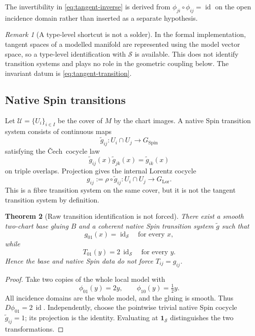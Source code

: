 \documentclass[11pt,a4paper]{article}
\newtheorem{theorem}{Theorem}[section]
\theoremstyle{definition}
\theoremstyle{remark}
\newtheorem{remark}[theorem]{Remark}
\newcommand{\Smodel}{\mathcal{S}}
\newcommand{\SpinG}{G_{\mathrm{Spin}}}
\newcommand{\LorG}{G_{\mathrm{Lor}}}
\newcommand{\id}{\operatorname{id}}
\newcommand{\Cech}{\ifmmode\text{\v{C}ech}\else\v{C}ech\fi}
\newcommand{\cU}{\mathcal{U}}
\begin{document}
The invertibility in \eqref{eq:tangent-inverse} is derived from
\(\phi_{ji}\circ\phi_{ij}=\id\) on the open incidence domain rather than
inserted as a separate hypothesis.

\begin{remark}[A type-level shortcut is not a solder]
In the formal implementation, tangent spaces of a modelled manifold are
represented using the model vector space, so a type-level identification
with \(\Smodel\) is available.  This does not identify transition systems
and plays no role in the geometric coupling below.  The invariant datum is
\eqref{eq:tangent-transition}.
\end{remark}

\subsection{Native Spin transitions}

Let \(\cU=\{U_i\}_{i\in I}\) be the cover of \(M\) by the chart images.
A native Spin transition system consists of continuous maps
\[
   \widetilde g_{ij}:U_i\cap U_j\longrightarrow\SpinG
\tag{6.3}
\]
satisfying the \Cech\ cocycle law
\[
   \widetilde g_{ij}(x)\widetilde g_{jk}(x)
   =
   \widetilde g_{ik}(x)
\tag{6.4}
\]
on triple overlaps.  Projection gives the internal Lorentz cocycle
\[
   g_{ij}:=\rho\circ\widetilde g_{ij}:
   U_i\cap U_j\longrightarrow\LorG.
\tag{6.5}
\]
This is a fibre transition system on the same cover, but it is not the
tangent transition system by definition.

\begin{theorem}[Raw transition identification is not forced]
\label{thm:transition-independence}
There exist a smooth two-chart base gluing \(B\) and a coherent native Spin
transition system \(\widetilde g\) such that
\[
   g_{01}(x)=\id_{\Smodel}
   \quad\text{for every }x,
\tag{6.6}
\]
while
\[
   T_{01}(y)=2\,\id_{\Smodel}
   \quad\text{for every }y.
\tag{6.7}
\]
Hence the base and native Spin data do not force
\(T_{ij}=g_{ij}\).
\end{theorem}

\begin{proof}
Take two copies of the whole local model with
\[
   \phi_{01}(y)=2y,\qquad
   \phi_{10}(y)=\tfrac12 y.
\]
All incidence domains are the whole model, and the gluing is smooth.
Thus \(D\phi_{01}=2\,\id\).  Independently, choose the pointwise trivial
native Spin cocycle \(\widetilde g_{ij}=1\); its projection is the identity.
Evaluating at \(\mathbf1_{\Smodel}\) distinguishes the two transformations.
\end{proof}
\end{document}
